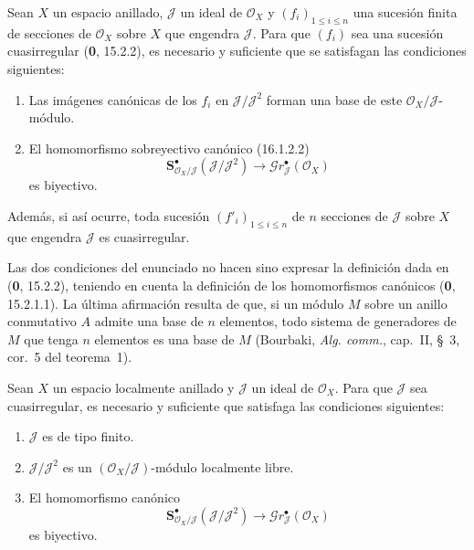 \begin{proposition}[16.9.3]
\label{IV.16.9.3}
Sean $X$ un espacio anillado, $\mathscr{J}$ un ideal de $\mathcal{O}_X$ y
$(f_i)_{1\leq i\leq n}$ una sucesión finita de secciones de $\mathcal{O}_X$
sobre $X$ que engendra $\mathscr{J}$. Para que $(f_i)$ sea una sucesión
cuasirregular \textup{(\textbf 0, 15.2.2)}, es necesario y suficiente que se satisfagan las
condiciones siguientes:
\begin{enumerate}
  \item[\textup{(i)}] Las imágenes canónicas de los $f_i$ en
  $\mathscr{J}/\mathscr{J}^2$ forman una base de este
  $\mathcal{O}_X/\mathscr{J}$-módulo.
  \item[\textup{(ii)}] El homomorfismo sobreyectivo canónico \textup{(16.1.2.2)}
  \[
    \mathbf{S}_{\mathcal{O}_X/\mathscr{J}}^{\bullet}
    (\mathscr{J}/\mathscr{J}^2)
    \longrightarrow\mathscr{G}r_{\mathscr{J}}^{\bullet}(\mathcal{O}_X)
  \]
  es biyectivo.
\end{enumerate}
Además, si así ocurre, toda sucesión $(f'_i)_{1\leq i\leq n}$ de $n$
secciones de $\mathscr{J}$ sobre $X$ que engendra $\mathscr{J}$ es
cuasirregular.
\end{proposition}


Las dos condiciones del enunciado no hacen sino expresar la definición dada
en (\textbf 0, 15.2.2), teniendo en cuenta la definición de los homomorfismos
canónicos (\textbf 0, 15.2.1.1). La última afirmación resulta de que, si un módulo $M$
sobre un anillo conmutativo $A$ admite una base de $n$ elementos, todo sistema
de generadores de $M$ que tenga $n$ elementos es una base de $M$ (Bourbaki,
\emph{Alg. comm.}, cap.~II, §~3, cor.~5 del teorema~1).

\begin{corollary}[16.9.4]
\label{IV.16.9.4}
Sean $X$ un espacio localmente anillado y $\mathscr{J}$ un ideal de
$\mathcal{O}_X$. Para que $\mathscr{J}$ sea cuasirregular, es necesario y
suficiente que satisfaga las condiciones siguientes:
\begin{enumerate}
  \item[\textup{(i)}] $\mathscr{J}$ es de tipo finito.
  \item[\textup{(ii)}] $\mathscr{J}/\mathscr{J}^2$ es un
  $(\mathcal{O}_X/\mathscr{J})$-módulo localmente libre.
  \item[\textup{(iii)}] El homomorfismo canónico
  \[
    \mathbf{S}_{\mathcal{O}_X/\mathscr{J}}^{\bullet}
    (\mathscr{J}/\mathscr{J}^2)
    \longrightarrow\mathscr{G}r_{\mathscr{J}}^{\bullet}(\mathcal{O}_X)
    \tag{16.9.4.1}
    \label{IV.16.9.4.1}
  \]
  es biyectivo.
\end{enumerate}
\end{corollary}


